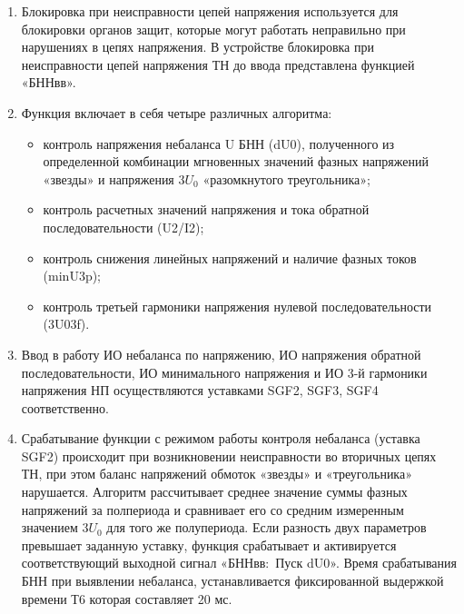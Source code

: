 
\color{black}

\begin{enumerate}

\item
Блокировка при неисправности цепей напряжения используется для блокировки органов защит, которые могут работать неправильно при нарушениях в цепях напряжения. В устройстве блокировка при неисправности цепей напряжения ТН до ввода представлена функцией «БННвв».

\item
Функция включает в себя четыре различных алгоритма:
\begin{itemize}
    \item контроль напряжения небаланса U БНН (dU0), полученного из определенной комбинации мгновенных значений фазных напряжений «звезды» и напряжения $3U_0$ «разомкнутого треугольника»;
    \item контроль расчетных значений напряжения и тока обратной последовательности (U2/I2);
    \item контроль снижения линейных напряжений и наличие фазных токов (minU3p);
    \item контроль третьей гармоники напряжения нулевой последовательности (3U03f).
\end{itemize}

\item
Ввод в работу ИО небаланса по напряжению, ИО напряжения обратной последовательности, ИО минимального напряжения и ИО 3-й гармоники напряжения НП осуществляются уставками SGF2, SGF3, SGF4 соответственно.

\item
Срабатывание функции с режимом работы контроля небаланса (уставка SGF2) происходит при возникновении неисправности во вторичных цепях ТН, при этом баланс напряжений обмоток «звезды» и «треугольника» нарушается. Алгоритм рассчитывает среднее значение суммы фазных напряжений за полпериода и сравнивает его со средним измеренным значением $3U_0$ для того же полупериода. Если разность двух параметров превышает заданную уставку, функция срабатывает и активируется соответствующий выходной сигнал «БННвв:~Пуск dU0». Время срабатывания БНН при выявлении небаланса, устанавливается фиксированной выдержкой времени Т6 которая составляет 20 мс.


\end{enumerate}
